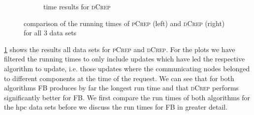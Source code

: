\documentclass[a4paper,UKenglish,cleveref, autoref, thm-restate,authorcolumns]{lipics-v2019}
\newcommand{\adjDel}{\textsc{pCrep}}
\newcommand{\directDecomp}{\textsc{dCrep}}
\newcommand{\fb}{FB}
\begin{document}
\begin{figure}[h]
\begin{minipage}{0.48\linewidth}
\begin{subfigure}[b]{\linewidth}
			\caption{time results for \directDecomp}
		\end{subfigure}		
	\end{minipage}
	\caption{comparison of the running times of \adjDel{} (left) and \directDecomp{} (right) for all 3 data sets}\label{fig:all_runtimes_boxplot}
\end{figure}

\cref{fig:all_runtimes_boxplot} shows the results all data sets for \adjDel{} and \directDecomp{}. For the plots we have filtered the running times to only include updates which have led the respective algorithm to update, i.e. those updates where the communicating nodes belonged to different components at the time of the request. 
We can see that for both algorithms \fb{} produces by far the longest run time and that \directDecomp{} performs significantly better for \fb{}.
We first compare the run times of both algorithms for the hpc data sets before we discuss the run times for \fb{} in greater detail.
\end{document}
